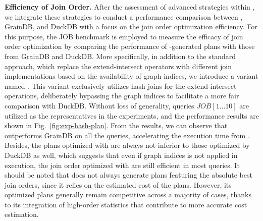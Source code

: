 \noindent\textbf{Efficiency of Join Order.}
After the assessment of advanced strategies within \relgo, we integrate these strategies to conduct a performance comparison between \relgo, GrainDB, and DuckDB with a focus on the join order optimization efficiency.
For this purpose, the JOB benchmark is employed to measure the efficacy of join order optimization by comparing the performance of \relgo-generated plans with those from GrainDB and DuckDB.
More specifically, in addition to the standard \relgo approach, which replace the extend-intersect operators with different join implementations based on the availability of graph indices, we introduce a variant named \relgohash. This variant exclusively utilizes hash joins for the extend-intersect operations, deliberately bypassing the graph indices to facilitate a more fair comparison with DuckDB.
Without loss of generality, queries $JOB[1\ldots 10]$ are utilized as the representatives in the experiments, and the performance results are shown in Fig.~\ref{fig:exp-hash-plan}. 
From the results, we can observe that \relgo outperforms GrainDB on all the queries, accelerating the execution time from .
Besides, the plans optimized with \relgohash are always not inferior to those optimized by DuckDB as well, which suggests that even if graph indices is not applied in execution, the join order optimized with \relgo are still efficient in most queries.
It should be noted that \relgo does not always generate plans featuring the absolute best join orders, since it relies on the estimated cost of the plans.
However, its optimized plans generally remain competitive across a majority of cases, thanks to its integration of high-order statistics that contribute to more accurate cost estimation.



